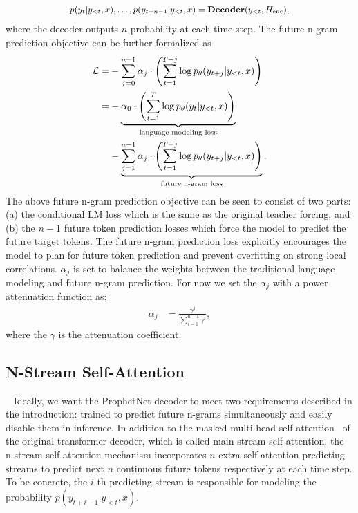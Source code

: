 \documentclass[11pt,a4paper]{article}
\begin{document}
\begin{align}
\small
\begin{split}
 & p(y_t|y_{<t},x), \dots, p(y_{t+n-1}|y_{<t},x)  = \textbf{Decoder}(y_{<t},H_{\rm{enc}}), \\
\end{split}
\label{decoder} 
\end{align}
where the decoder outputs $n$ probability at each time step.
The future n-gram prediction objective can be further formalized as 
\begin{align} 
    \mathcal{L} = &- \sum_{j=0}^{n-1} \alpha_j \cdot \left( \sum_{t=1}^{T-j} \log p_\theta(y_{t+j}|y_{<t},x)\right) \notag\\ 
    = &- \underbrace{\alpha_0 \cdot \left( \sum_{t=1}^T \log p_\theta(y_{t}|y_{<t},x)\right)}_{\text{language modeling loss}} \notag\\  
    &- \underbrace{\sum_{j=1}^{n-1} \alpha_{j} \cdot \left( \sum_{t=1}^{T-j} \log p_\theta(y_{t+j}|y_{<t},x)\right)}_{\text{future n-gram loss}}.
\end{align}
The above future n-gram prediction objective can be seen to consist of two parts: (a) the conditional LM loss which is the same as the original teacher forcing, and (b) the $n-1$ future token prediction losses which force the model to predict the future target tokens.
The future n-gram prediction loss explicitly encourages the model to plan for future token prediction and prevent overfitting on strong local correlations. 
$\alpha_j$ is set to balance the weights between the traditional language modeling and future n-gram prediction. 
For now we set the $\alpha_j$ with a power attenuation function as:
\begin{align}
    \alpha_{j} &= \frac{\gamma^j}{\sum_{i=0}^{n-1}\gamma^i},
\end{align}
where the $\gamma$ is the attenuation coefficient. 




\subsection{N-Stream Self-Attention}~\label{sec:m2}
Ideally, we want the ProphetNet decoder to meet two requirements described in the introduction: trained to predict future n-grams simultaneously and easily disable them in inference.
In addition to the masked multi-head self-attention~\cite{vaswani2017attention} of the original transformer decoder, which is called main stream self-attention, the n-stream self-attention mechanism incorporates $n$ extra self-attention predicting streams to predict next $n$ continuous future tokens respectively at each time step.
To be concrete, the $i$-th predicting stream is responsible for modeling the probability $p(y_{t+i-1} | y_{<t}, x)$.
\end{document}
